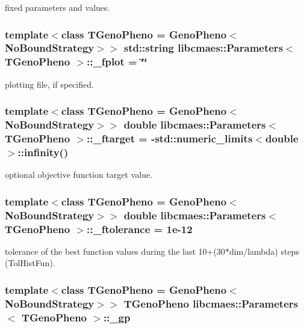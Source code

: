 fixed parameters and values. \hypertarget{classlibcmaes_1_1Parameters_aa49511ea00199348ea94f1aa53fe5bc1}{
\subsubsection[{\-\_\-fplot}]{\setlength{\rightskip}{0pt plus 5cm}template$<$class T\-Geno\-Pheno = Geno\-Pheno$<$\-No\-Bound\-Strategy$>$$>$ std\-::string {\bf libcmaes\-::\-Parameters}$<$ T\-Geno\-Pheno $>$\-::\-\_\-fplot = \char`\"{}\char`\"{}}}\label{classlibcmaes_1_1Parameters_aa49511ea00199348ea94f1aa53fe5bc1}
plotting file, if specified. \hypertarget{classlibcmaes_1_1Parameters_a837dbcfba351a043441076a11666f92c}{
\subsubsection[{\-\_\-ftarget}]{\setlength{\rightskip}{0pt plus 5cm}template$<$class T\-Geno\-Pheno = Geno\-Pheno$<$\-No\-Bound\-Strategy$>$$>$ double {\bf libcmaes\-::\-Parameters}$<$ T\-Geno\-Pheno $>$\-::\-\_\-ftarget = -\/std\-::numeric\-\_\-limits$<$double$>$\-::infinity()}}\label{classlibcmaes_1_1Parameters_a837dbcfba351a043441076a11666f92c}
optional objective function target value. \hypertarget{classlibcmaes_1_1Parameters_ab6c11cc112b5709e9039967e881c808e}{
\subsubsection[{\-\_\-ftolerance}]{\setlength{\rightskip}{0pt plus 5cm}template$<$class T\-Geno\-Pheno = Geno\-Pheno$<$\-No\-Bound\-Strategy$>$$>$ double {\bf libcmaes\-::\-Parameters}$<$ T\-Geno\-Pheno $>$\-::\-\_\-ftolerance = 1e-\/12}}\label{classlibcmaes_1_1Parameters_ab6c11cc112b5709e9039967e881c808e}
tolerance of the best function values during the last 10+(30$\ast$dim/lambda) steps (Tol\-Hist\-Fun). \hypertarget{classlibcmaes_1_1Parameters_ab8e153b4785de9358599caa840b94ef2}{
\subsubsection[{\-\_\-gp}]{\setlength{\rightskip}{0pt plus 5cm}template$<$class T\-Geno\-Pheno = Geno\-Pheno$<$\-No\-Bound\-Strategy$>$$>$ T\-Geno\-Pheno {\bf libcmaes\-::\-Parameters}$<$ T\-Geno\-Pheno $>$\-::\-\_\-gp}}\label{classlibcmaes_1_1Parameters_ab8e153b4785de9358599caa840b94ef2}
